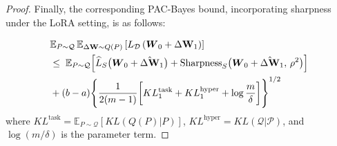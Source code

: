 \documentclass[letterpaper]{article} %
\begin{document}
\begin{proof}
Finally, the corresponding PAC-Bayes bound, incorporating sharpness under the LoRA setting, is as follows:

\begin{align}
& \mathbb{E}_{P \sim \mathcal{Q}}\, \mathbb{E}_{\Delta\mathbf{W} \sim Q(P)} 
    \left[ L_{\mathcal{D}}\left(\boldsymbol{W}_0 + \Delta\mathbf{W}_1\right) \right] \notag \\
& \leq\; \mathbb{E}_{P \sim \mathcal{Q}} \Big[
        \widehat{L}_S\big(\boldsymbol{W}_0 + \hat{\Delta\mathbf{W}}_1\big)
        + \mathrm{Sharpness}_S\big(\boldsymbol{W}_0 + \hat{\Delta\mathbf{W}}_1,\, \rho^2\big)
    \Big] \notag \\
& + (b-a) 
    \Bigg\{ \frac{1}{2(m-1)} \bigg[
        KL^{\text{task}}_1 + KL^{\text{hyper}}_1 + \log\frac{m}{\delta}
    \bigg] \Bigg\}^{1/2}
\label{eq:single-task-pac-bayes}
\end{align}
where $KL^{\text{task}} = \mathbb{E}_{P \sim \mathcal{Q}}\left[ KL(Q(P)|P) \right]$,
$KL^{\text{hyper}} = KL(\mathcal{Q}|\mathcal{P})$,
and $\log(m/\delta)$ is the parameter term.

















\end{proof}
\end{document}
